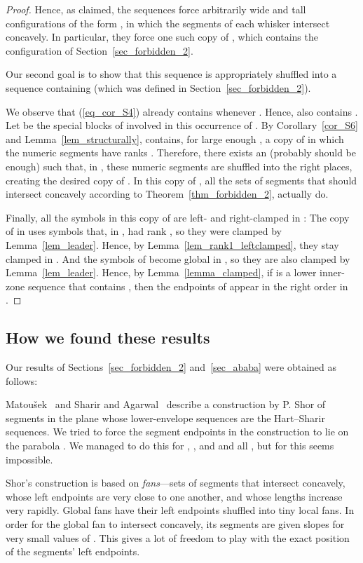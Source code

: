 \documentclass[11pt]{article}
\theoremstyle{definition}
\theoremstyle{remark}
\begin{document}
\begin{proof}
Hence, as claimed, the sequences  force arbitrarily wide and tall configurations of the form , in which the segments of each whisker intersect concavely. In particular, they force one such copy of , which contains the configuration  of Section~\ref{sec_forbidden_2}.

Our second goal is to show that this sequence  is appropriately shuffled into a sequence containing  (which was defined in Section~\ref{sec_forbidden_2}).

We observe that (\ref{eq_cor_S4}) already contains  whenever . Hence,  also contains . Let  be the special blocks of  involved in this occurrence of . By Corollary~\ref{cor_S6} and Lemma~\ref{lem_structurally},  contains, for large enough , a copy of  in which the numeric segments have ranks . Therefore, there exists an  (probably  should be enough) such that, in , these numeric segments are shuffled into the right places, creating the desired copy of . In this copy of , all the sets of segments that should intersect concavely according to Theorem~\ref{thm_forbidden_2}, actually do.

Finally, all the symbols in this copy of  are left- and right-clamped in : The copy of  in  uses symbols that, in , had rank , so they were clamped by Lemma~\ref{lem_leader}. Hence, by Lemma~\ref{lem_rank1_leftclamped}, they stay clamped in . And the symbols of  become global  in , so they are also clamped by Lemma~\ref{lem_leader}. Hence, by Lemma~\ref{lemma_clamped}, if  is a lower inner-zone sequence that contains , then the endpoints of  appear in the right order in .
\end{proof}

\subsection{How we found these results}

Our results of Sections~\ref{sec_forbidden_2} and~\ref{sec_ababa} were obtained as follows:

Matou\v sek~\cite{mat_DG} and Sharir and Agarwal~\cite{DS_book} describe a construction by P. Shor of segments in the plane whose lower-envelope sequences are the Hart--Sharir sequences. We tried to force the segment endpoints in the construction to lie on the parabola . We managed to do this for , , and  and all , but for  this seems impossible.

Shor's construction is based on \emph{fans}---sets of segments that intersect concavely, whose left endpoints are very close to one another, and whose lengths increase very rapidly.  Global fans have their left endpoints shuffled into tiny local fans. In order for the global fan to intersect concavely, its segments are given slopes  for very small values of . This gives a lot of freedom to play with the exact position of the segments' left endpoints.
\end{document}
